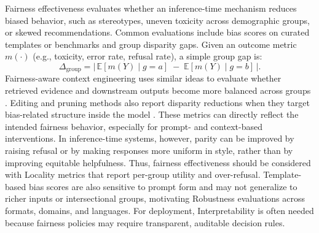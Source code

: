 Fairness effectiveness evaluates whether an inference-time mechanism reduces biased behavior, such as stereotypes, uneven toxicity across demographic groups, or skewed recommendations. Common evaluations include bias scores on curated templates or benchmarks \citep{dwivedi2023breaking, huang2024bias, fayyazi2025facter, dhingra2023queer, kamruzzaman2024prompting} and group disparity gaps. Given an outcome metric $m(\cdot)$ (e.g., toxicity, error rate, refusal rate), a simple group gap is:
\[
\Delta_{\mathrm{group}}
=
\left|\, \mathbb{E}[m(Y)\mid g{=}a] \;-\; \mathbb{E}[m(Y)\mid g{=}b] \,\right|.
\]
Fairness-aware context engineering uses similar ideas to evaluate whether retrieved evidence and downstream outputs become more balanced across groups \citep{chen2024spica, shrestha2024fairrag}. Editing and pruning methods also report disparity reductions when they target bias-related structure inside the model \citep{cai2024locating, qin2024mitigating, zayed2024fairness, dasu2025attention, ma2025breaking}. These metrics can directly reflect the intended fairness behavior, especially for prompt- and context-based interventions. In inference-time systems, however, parity can be improved by raising refusal or by making responses more uniform in style, rather than by improving equitable helpfulness. Thus, fairness effectiveness should be considered with Locality metrics that report per-group utility and over-refusal. Template-based bias scores are also sensitive to prompt form and may not generalize to richer inputs or intersectional groups, motivating Robustness evaluations across formats, domains, and languages. For deployment, Interpretability is often needed because fairness policies may require transparent, auditable decision rules.




